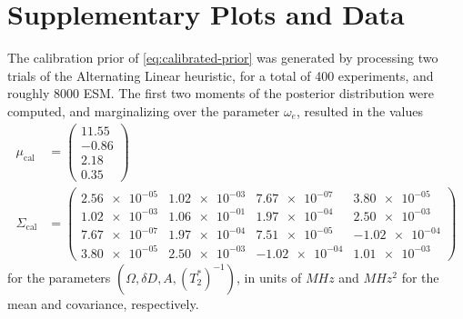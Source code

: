 \documentclass[aps,nofootinbib,twocolumn,superscriptaddress]{revtex4}
\newcommand{\calib}{{\text{cal}}}
\begin{document}






\appendix
\onecolumngrid

\section{Supplementary Plots and Data}
\label{apx:supp-plots-and-data}

The calibration prior of \autoref{eq:calibrated-prior} was generated
by processing two trials of the Alternating Linear heuristic, for
a total of 400 experiments, and roughly 8000 ESM.
The first two moments of the posterior distribution were computed,
and marginalizing over the parameter $\omega_e$, resulted in
the values
\begin{subequations}
\begin{align}
    \mu_\calib&=\begin{pmatrix}
        11.55 \\ -0.86 \\ 2.18 \\ 0.35
    \end{pmatrix} \\
    \Sigma_\calib&=\begin{pmatrix}
        \num{2.56e-05} & \num{1.02e-03} & \num{7.67e-07} & \num{3.80e-05} \\
        \num{1.02e-03} & \num{1.06e-01} & \num{1.97e-04} & \num{2.50e-03} \\
        \num{7.67e-07} & \num{1.97e-04} & \num{7.51e-05} & \num{-1.02e-04} \\
        \num{3.80e-05} & \num{2.50e-03} & \num{-1.02e-04} & \num{1.01e-03}
        \end{pmatrix}
\end{align}
\end{subequations}
for the parameters $(\Omega,\delta D,A,(T_2^*)^{-1})$, in units
of $\si{MHz}$ and $\si{MHz^2}$ for the mean and covariance, respectively.
\end{document}
